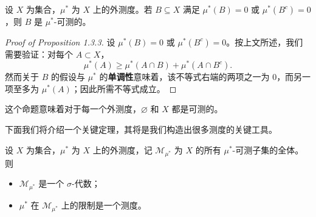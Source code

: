 \documentclass[11pt]{article}
\newcommand{\calM}{\mathcal{M}}
\newcommand{\diam}{\varnothing}
\begin{document}
\begin{proposition}
    设 $X$ 为集合，$\mu^*$ 为 $X$ 上的外测度。若 $B \subseteq X$ 满足 $\mu^*(B)=0$ 或 $\mu^*(B^c)=0$，则 $B$ 是 $\mu^*$-可测的。
\end{proposition}

\begin{proof}[Proof of Proposition 1.3.3]
    设 $\mu^*(B)=0$ 或 $\mu^*(B^c)=0$。按上文所述，我们需要验证：对每个 $A \subset X$，
    \[
        \mu^*(A) \ge \mu^*(A\cap B) + \mu^*(A\cap B^c).
    \]
    然而关于 $B$ 的假设与 $\mu^*$ 的{\normalfont\bfseries 单调性}意味着，该不等式右端的两项之一为 $0$，而另一项至多为 $\mu^*(A)$；因此所需不等式成立。
\end{proof}

这个命题意味着对于每一个外测度，$\diam$ 和 $X$ 都是可测的。

下面我们将介绍一个关键定理，其将是我们构造出很多测度的关键工具。

\begin{theorem}
    设 $X$ 为集合，$\mu^*$ 为 $X$ 上的外测度，记 $\calM_{\mu^*}$ 为 $X$ 的所有 $\mu^*$-可测子集的全体。则
    \begin{itemize}
        \item $\calM_{\mu^*}$ 是一个 $\sigma$-代数；
        \item $\mu^*$ 在 $\calM_{\mu^*}$ 上的限制是一个测度。
    \end{itemize}
\end{theorem}
\end{document}
